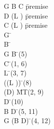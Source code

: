 \documentclass{article}
\begin{document}
\begin{proofbox}
\: G \lor B \rightarrow C \= \hbox{premise} \\
\: \lnot D \rightarrow \lnot (L \rightarrow \bot) \= \hbox{premise} \\
\: C \rightarrow (L \rightarrow \bot) \= \hbox{premise} \\
\open
\: G \= \asm \\
\open
\: B \= \asm \\
\: G \lor B \= \orintro(5) \\
\: C \= \implieselim(1, 6) \\
\: L \rightarrow \bot \= \implieselim(3, 7) \\
\: \lnot (\lnot (L \rightarrow \bot)) \= \doublenegintro(8) \\
\: \lnot (\lnot D) \= MT(2, 9) \\
\: D \= \doublenegelim(10) \\
\close
\: B \rightarrow D \= \impliesintro(5, 11) \\
\close
\: G \rightarrow (B \rightarrow D) \= \impliesintro(4, 12) \\
\end{proofbox}
\end{document}
